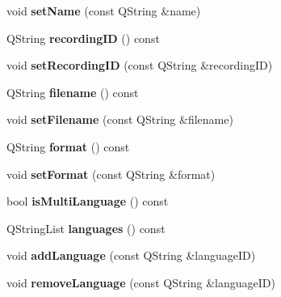 \begin{DoxyCompactItemize}
void {\bfseries set\+Name} (const Q\+String \&name)
\item 
\mbox{\label{class_corpus_annotation_ae64f1c514ad722bb7a8abe5052f22ace}} 
Q\+String {\bfseries recording\+ID} () const
\item 
\mbox{\label{class_corpus_annotation_a9955b82391b40b6c8c39c26b9036bd1b}} 
void {\bfseries set\+Recording\+ID} (const Q\+String \&recording\+ID)
\item 
\mbox{\label{class_corpus_annotation_af0a0a7c4128d6fa9b010e027571c195e}} 
Q\+String {\bfseries filename} () const
\item 
\mbox{\label{class_corpus_annotation_aaa35e7b750a3735f8aa29fe2d2a79497}} 
void {\bfseries set\+Filename} (const Q\+String \&filename)
\item 
\mbox{\label{class_corpus_annotation_ae058e5a667a46dd0faaba1268e589e0b}} 
Q\+String {\bfseries format} () const
\item 
\mbox{\label{class_corpus_annotation_a09849335dcca310cd05cd92a19517ab0}} 
void {\bfseries set\+Format} (const Q\+String \&format)
\item 
\mbox{\label{class_corpus_annotation_a3c8175817f0272d5d3fee3842b467190}} 
bool {\bfseries is\+Multi\+Language} () const
\item 
\mbox{\label{class_corpus_annotation_a1e4de8bf7fee8f722898de91eca5f43c}} 
Q\+String\+List {\bfseries languages} () const
\item 
\mbox{\label{class_corpus_annotation_af0cf8b8b30fb75de053c300eea662df1}} 
void {\bfseries add\+Language} (const Q\+String \&language\+ID)
\item 
\mbox{\label{class_corpus_annotation_a0bfc429fa745f304b507b5a80568e12b}} 
void {\bfseries remove\+Language} (const Q\+String \&language\+ID)
\end{DoxyCompactItemize}
